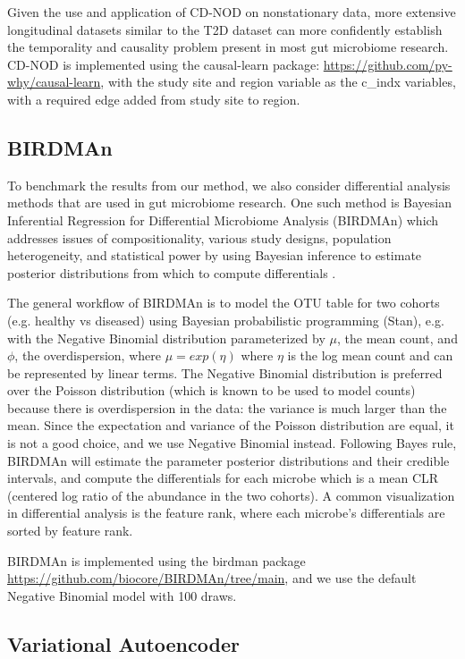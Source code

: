 \documentclass[12pt,letterpaper]{article}
\begin{document}
Given the use and application of CD-NOD on nonstationary data, more extensive longitudinal datasets similar to the T2D dataset can more confidently establish the temporality and causality problem present in most gut microbiome research. CD-NOD is implemented using the causal-learn package: \url{https://github.com/py-why/causal-learn}, with the study site and region variable as the c\_indx variables, with a required edge added from study site to region. 

\subsection{BIRDMAn}

To benchmark the results from our method, we also consider differential analysis methods that are used in gut microbiome research. One such method is Bayesian Inferential Regression for Differential Microbiome Analysis (BIRDMAn) which addresses issues of compositionality, various study designs, population heterogeneity, and statistical power by using Bayesian inference to estimate posterior distributions from which to compute differentials \citep{rahman2023birdman}.

The general workflow of BIRDMAn is to model the OTU table for two cohorts (e.g. healthy vs diseased) using Bayesian probabilistic programming (Stan), e.g. with the Negative Binomial distribution parameterized by $\mu$, the mean count, and $\phi$, the overdispersion, where $\mu = exp(\eta)$ where $\eta$ is the log mean count and can be represented by linear terms. The Negative Binomial distribution is preferred over the Poisson distribution (which is known to be used to model counts) because there is overdispersion in the data: the variance is much larger than the mean. Since the expectation and variance of the Poisson distribution are equal, it is not a good choice, and we use Negative Binomial instead. Following Bayes rule, BIRDMAn will estimate the parameter posterior distributions and their credible intervals, and compute the differentials for each microbe which is a mean CLR (centered log ratio of the abundance in the two cohorts). A common visualization in differential analysis is the feature rank, where each microbe’s differentials are sorted by feature rank. 

BIRDMAn is implemented using the birdman package \url{https://github.com/biocore/BIRDMAn/tree/main}, and we use the default Negative Binomial model with 100 draws. 

\subsection{Variational Autoencoder} 
\end{document}

